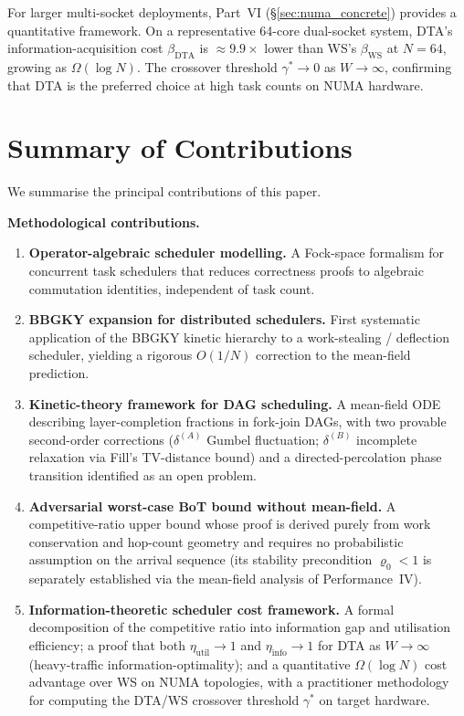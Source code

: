 \documentclass[11pt,a4paper]{article}
\begin{document}
For larger multi-socket deployments, Part~VI (\S\ref{sec:numa_concrete})
provides a quantitative framework.  On a representative 64-core dual-socket
system, DTA's information-acquisition cost $\beta_{\mathrm{DTA}}$ is
$\approx 9.9\times$ lower than WS's $\beta_{\mathrm{WS}}$ at $N=64$,
growing as $\Omega(\log N)$.  The crossover threshold $\gamma^* \to 0$
as $W \to \infty$, confirming that DTA is the preferred choice at high
task counts on NUMA hardware.

\section{Summary of Contributions}
\label{sec:contributions}

We summarise the principal contributions of this paper.

\medskip
\noindent\textbf{Methodological contributions.}
\begin{enumerate}
  \item \textbf{Operator-algebraic scheduler modelling.}
        A Fock-space formalism for concurrent task schedulers that reduces
        correctness proofs to algebraic commutation identities, independent
        of task count.
  \item \textbf{BBGKY expansion for distributed schedulers.}
        First systematic application of the BBGKY kinetic hierarchy to
        a work-stealing / deflection scheduler, yielding a rigorous
        $O(1/N)$ correction to the mean-field prediction.
  \item \textbf{Kinetic-theory framework for DAG scheduling.}
        A mean-field ODE describing layer-completion fractions in
        fork-join DAGs, with two provable second-order corrections
        ($\delta^{(A)}$ Gumbel fluctuation; $\delta^{(B)}$ incomplete
        relaxation via Fill's TV-distance bound) and a directed-percolation
        phase transition identified as an open problem.
  \item \textbf{Adversarial worst-case BoT bound without mean-field.}
        A competitive-ratio upper bound whose proof is derived purely
        from work conservation and hop-count geometry and requires no
        probabilistic assumption on the arrival sequence (its stability
        precondition $\varrho_0 < 1$ is separately established via the
        mean-field analysis of Performance~IV).
  \item \textbf{Information-theoretic scheduler cost framework.}
        A formal decomposition of the competitive ratio into information
        gap and utilisation efficiency; a proof that both
        $\eta_{\mathrm{util}} \to 1$ and $\eta_{\mathrm{info}} \to 1$ for
        DTA as $W \to \infty$ (heavy-traffic information-optimality); and a
        quantitative $\Omega(\log N)$ cost advantage over WS on NUMA
        topologies, with a practitioner methodology for computing the
        DTA/WS crossover threshold $\gamma^*$ on target hardware.
\end{enumerate}
\end{document}

